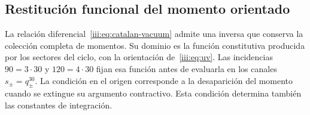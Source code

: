 \subsection{Restitución funcional del momento orientado}
\label{iii:sec:restitucion-funcional-catalan}

La relación diferencial~\eqref{iii:eq:catalan-vacuum} admite una
inversa que conserva la colección completa de momentos. Su dominio es
la función constitutiva producida por los sectores del ciclo, con la
orientación de~\eqref{iii:eq:uv}. Las incidencias $90=3\cdot30$ y
$120=4\cdot30$ fijan esa función antes de evaluarla en los canales
$s_\pm=q_\pm^{30}$. La condición en el origen corresponde a la
desaparición del momento cuando se extingue su argumento contractivo.
Esta condición determina también las constantes de integración.

